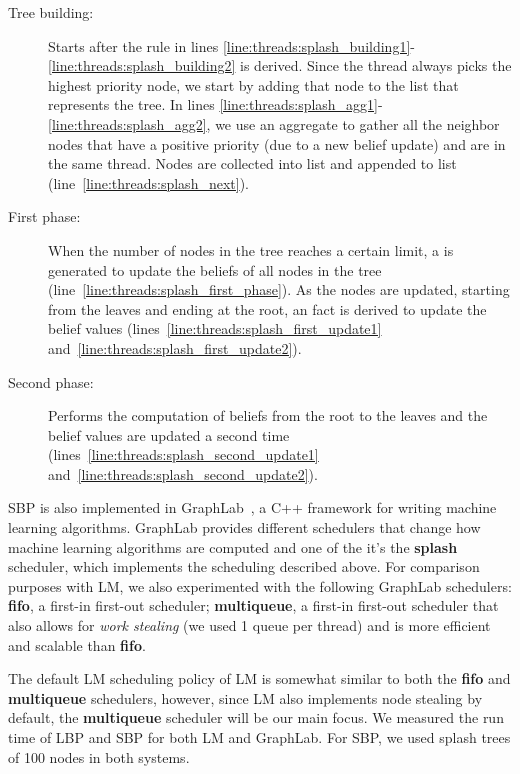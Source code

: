 \begin{description}

   \item[Tree building:] Starts after the rule in lines
      \ref{line:threads:splash_building1}-\ref{line:threads:splash_building2} is
      derived. Since the thread always picks the highest priority node, we start
      by adding that node to the list that represents the tree. In lines
      \ref{line:threads:splash_agg1}-\ref{line:threads:splash_agg2}, we use an
      aggregate to gather all the neighbor nodes that have a positive priority
      (due to a new belief update) and are in the same thread. Nodes are
      collected into list  and appended to list 
      (line~\ref{line:threads:splash_next}).

   \item[First phase:] When the number of nodes in the tree reaches a certain
      limit, a  is generated to update the beliefs of all
      nodes in the tree (line~\ref{line:threads:splash_first_phase}). As the
      nodes are updated, starting from the leaves and ending at the root, an
       fact is derived to update the belief values
      (lines~\ref{line:threads:splash_first_update1}
      and~\ref{line:threads:splash_first_update2}).

   \item[Second phase:] Performs the computation of beliefs from the root to the
      leaves and the belief values are updated a second time
      (lines~\ref{line:threads:splash_second_update1}
      and~\ref{line:threads:splash_second_update2}).

\end{description}

SBP is also implemented in GraphLab~\cite{GraphLab2010}, a C++ framework for
writing machine learning algorithms. GraphLab provides different schedulers that
change how machine learning algorithms are computed and one of the it's the
\textbf{splash} scheduler, which implements the scheduling described above. For
comparison purposes with LM, we also experimented with the following GraphLab
schedulers: \textbf{fifo}, a first-in first-out scheduler; \textbf{multiqueue}, a first-in first-out scheduler that
also allows for \textit{work stealing} (we used 1 queue per thread) and is more
efficient and scalable than \textbf{fifo}.

The default LM scheduling policy of LM is somewhat similar to both the
\textbf{fifo} and \textbf{multiqueue} schedulers, however, since LM also
implements node stealing by default, the \textbf{multiqueue} scheduler will be
our main focus. We measured the run time of LBP and SBP for both LM and
GraphLab. For SBP, we used splash trees of 100 nodes in both systems.

